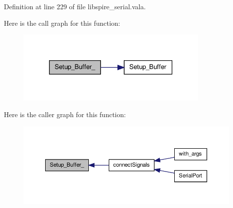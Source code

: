 Definition at line 229 of file libspire\-\_\-serial.\-vala.



Here is the call graph for this function\-:\nopagebreak
\begin{figure}[H]
\begin{center}
\leavevmode
\includegraphics[width=270pt]{namespaceedwinspire_1_1_ports_a7a08c939ddf6ae7e1426b3bd061c3f13_cgraph}
\end{center}
\end{figure}




Here is the caller graph for this function\-:\nopagebreak
\begin{figure}[H]
\begin{center}
\leavevmode
\includegraphics[width=350pt]{namespaceedwinspire_1_1_ports_a7a08c939ddf6ae7e1426b3bd061c3f13_icgraph}
\end{center}
\end{figure}


